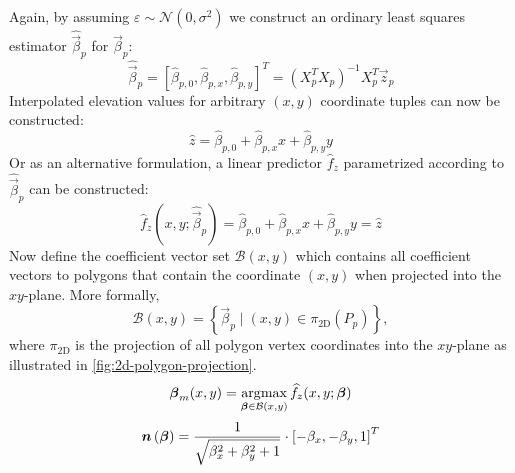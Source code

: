 %
Again, by assuming $\varepsilon \sim \mathcal{N}(0, \sigma^2)$ we construct an ordinary least squares estimator $\widehat{\vec{\beta}}_p $ for $\vec{\beta}_p$:
%
\begin{equation*}
  \widehat{\vec{\beta}}_p
  =
  {\left[
    \widehat{\beta}_{p,0},
    \widehat{\beta}_{p,x},
    \widehat{\beta}_{p,y}
  \right]}^T
  =
  \left( X_p^T X_p \right)^{-1} X_p^T \vec{z}_p
\end{equation*}
%
Interpolated elevation values for arbitrary $(x, y)$ coordinate tuples can now be constructed:
%
\begin{equation*}
  \widehat{z} = \widehat{\beta}_{p,0} + \widehat{\beta}_{p,x} x + \widehat{\beta}_{p,y} y
\end{equation*}
%
Or as an alternative formulation, a linear predictor $\widehat{f}_z$ parametrized according to $\widehat{\vec{\beta}}_p$ can be constructed:
%
\begin{equation*}
  \widehat{f}_z\left(x, y; \widehat{\vec{\beta}}_p\right)
  =
    \widehat{\beta}_{p,0}
    + \widehat{\beta}_{p,x} x
    + \widehat{\beta}_{p,y} y
  =
  \widehat{z}
\end{equation*}
%
Now define the coefficient vector set $\mathcal{B}(x, y)$ which contains all coefficient vectors to polygons that contain the coordinate $(x, y)$ when projected into the $xy$-plane.
More formally,
%
\begin{equation*}
  \mathcal{B}(x, y) = \left\{
    \vec{\beta}_p
    \mid
    (x, y) \in \pi_{\mathrm{2D}}(P_p)
  \right\},
\end{equation*}
%
where $\pi_{\mathrm{2D}}$ is the projection of all polygon vertex coordinates into the $xy$-plane as illustrated in \cref{fig:2d-polygon-projection}.
%
\begin{equation*}
  \boldsymbol{\beta}_m(x, y)
  =
  \operatorname*{\arg\!\max}_{\boldsymbol{\beta} \in \mathcal{B}(x, y)}
    \widehat{f}_z(x, y; \boldsymbol{\beta})
\end{equation*}
%
\begin{equation*}
  \vec{n}\left(\vec{\beta}\right)
  =
  \frac{%
    1
  }{%
    \sqrt{\beta_x^2 + \beta_y^2 + 1}
  }
  \cdot
  {\left[
    -\beta_{x}, -\beta_{y}, 1
  \right]}^T
\end{equation*}




